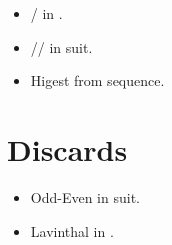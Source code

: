 \begin{itemize}
  \item {}/ in \N.
  \item {}// in suit.
  \item Higest from sequence.
\end{itemize}

\section{Discards} \label{sec:}

\begin{itemize}
  \item Odd-Even in suit.
  \item Lavinthal in \N.
\end{itemize}
